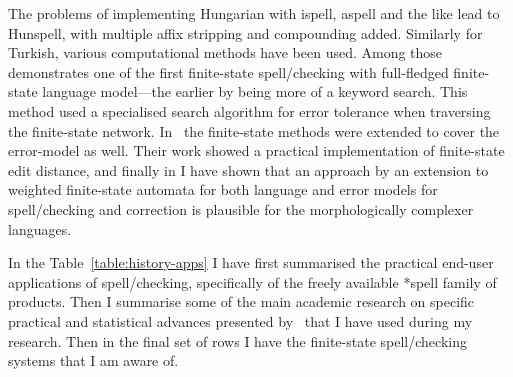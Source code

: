 \documentclass[officiallayout]{unihelcompling}
\begin{document}
The problems of implementing Hungarian with ispell, aspell and the like lead to
Hunspell, with multiple affix stripping and compounding added. Similarly for
Turkish, various computational methods have been used. Among
those~\citet{oflazer1996errortolerant} demonstrates one of the first
finite-state spell\-/checking with full-fledged finite-state language
model---the earlier by \citep{aho1975efficient} being more of a keyword search.
This method used a specialised search algorithm for error tolerance when
traversing the finite-state network.  In~\citet{agata2002typographical} the
finite-state methods were extended to cover the error-model as well. Their work
showed a practical implementation of finite-state edit distance, and finally in
 I have shown that an approach by an
extension to weighted finite-state automata for both language and error models
for spell\-/checking and correction is plausible for the morphologically
complexer languages.


In the Table~\ref{table:history-apps} I have first summarised the practical
end-user applications of spell\-/checking, specifically of the freely available
*spell family of products. Then I summarise some of the main academic research
on specific practical and statistical advances presented
by~\citet{al2006learning} that I have used during my research. Then in the
final set of rows I have the finite-state spell\-/checking systems that I am
aware of.
\end{document}
